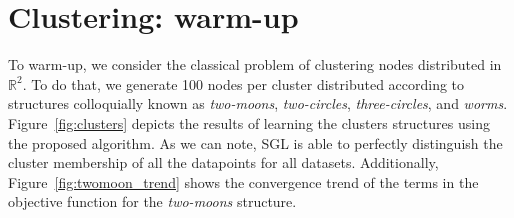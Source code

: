 \section{Clustering: warm-up}
To warm-up, we consider the classical problem of clustering nodes distributed
in $\mathbb{R}^{2}$. To do that, we generate 100 nodes per cluster distributed according to
structures colloquially known as \textit{two-moons}, \textit{two-circles}, \textit{three-circles},
and \textit{worms}.
Figure~\ref{fig:clusters} depicts the results of learning the
clusters structures using the proposed algorithm.
As we can note, \textsf{SGL} is able to perfectly distinguish the cluster membership
of all the datapoints for all datasets. Additionally, Figure~\ref{fig:twomoon_trend}
shows the convergence trend of the terms in the objective function for the \textit{two-moons} structure.

